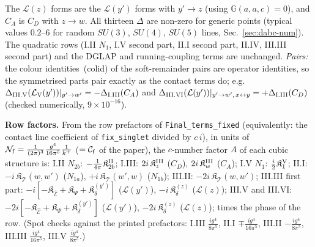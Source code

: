 \documentclass[10pt]{article}
\def\mf#1{\mathbb{#1}}
\begin{document}
The $\mathcal{L}(z)$ forms are the $\mathcal{L}(y')$ forms with $y'\to z$ (using $\mf{G}(a,a,c)=0$), and $C_{A}$ is $C_{D}$ with $z\to w$. All thirteen $\Delta$ are non-zero for generic points (typical values $0.2$--$6$ for random $SU(3)$, $SU(4)$, $SU(5)$ lines, Sec.~\ref{sec:dabc-num}). The quadratic rows (I.II $N_{1}$, I.V second part, II.I second part, II.IV, III.III second part) and the DGLAP and running-coupling terms are unchanged. \emph{Pairs:} the colour identities~(colid) of the soft-remainder pairs are operator identities, so the symmetrised parts pair exactly as the contact terms do; e.g.\ $\Delta_{\rm III.V}(\mathcal{L}_{\rm V}(y'))|_{y'\to w'}=-\Delta_{\rm I.III}(C_{A})$ and $\Delta_{\rm III.VI}(\mathcal{L}(y'))|_{y'\to w',\,x\leftrightarrow y}=+\Delta_{\rm I.III}(C_{D})$ (checked numerically, $9\times10^{-16}$).

\noindent\textbf{Row factors.} From the row prefactors of \texttt{Final\_terms\_fixed} (equivalently: the contact line coefficient of \texttt{fix\_singlet} divided by $c\,i$), in units of $\mathcal{N}_{\rm f}=\frac{1}{(2\pi)^{3}}\frac{g^{4}}{16\pi^{5}}\frac{1}{k^{+}}$ ($=\mathcal{C}_{\rm f}$ of the paper), the $c$-number factor $A$ of each cubic structure is: I.II $N_{2b}$: $-\frac{1}{4\pi}\mathfrak{K}^{\rm II}_{2b}$; I.III: $2i\,\mathfrak{K}^{\rm III}_{z}$ ($C_{D}$), $2i\,\mathfrak{K}^{\rm III}_{w}$ ($C_{A}$); I.V $N_{1}$: $\frac{i}{2}\mathfrak{K}^{\rm V}_{1}$; II.I: $-i\,\mathfrak{K}_{\mathcal{T}}(w,w')$ ($N_{1a}$), $+i\,\mathfrak{K}_{\mathcal{T}}(w',w)$ ($N_{1b}$); III.II: $-2i\,\mathfrak{K}_{\mathcal{T}}(w,w')$; III.III first part: $-i[-\mathfrak{K}_{\widehat{\mathcal{E}}}+\mathfrak{K}_{\Psi}+\mathfrak{K}^{(y')}_{\delta}]$ ($\mathcal{L}(y')$), $-i\,\mathfrak{K}^{(z)}_{\delta}$ ($\mathcal{L}(z)$); III.V and III.VI: $-2i[-\mathfrak{K}_{\widehat{\mathcal{E}}}+\mathfrak{K}_{\Psi}+\mathfrak{K}^{(y')}_{\delta}]$ ($\mathcal{L}(y')$), $-2i\,\mathfrak{K}^{(z)}_{\delta}$ ($\mathcal{L}(z)$); times the phase of the row. (Spot checks against the printed prefactors: I.III $\frac{ig^{4}}{8\pi^{5}}$, II.I $\mp\frac{ig^{4}}{16\pi^{5}}$, III.II $-\frac{ig^{4}}{8\pi^{5}}$, III.III $\frac{ig^{4}}{16\pi^{5}}$, III.V $\frac{ig^{4}}{8\pi^{5}}$.)
\end{document}
